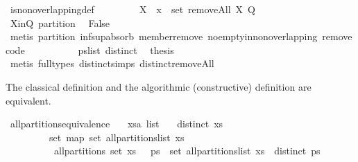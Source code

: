 \begin{isabellebody}
\ is{\isacharunderscore}non{\isacharunderscore}overlapping{\isacharunderscore}def\ \isacommand{{\isachardot}}\isamarkupfalse%
\isanewline
\ \ \ \ \ \ \isamarkupfalse%
\ {\isachardoublequoteopen}X\ {\isasymunion}\ {\isacharbraceleft}x{\isacharbraceright}\ {\isasymin}\ set\ {\isacharparenleft}removeAll\ X\ Q{\isacharparenright}{\isachardoublequoteclose}\isanewline
\ \ \ \ \ \ \isamarkupfalse%
\ X{\isacharunderscore}in{\isacharunderscore}Q\ partition\ \isamarkupfalse%
\ False\ \isamarkupfalse%
\ {\isacharparenleft}metis\ partition{\isacharprime}\ inf{\isacharunderscore}sup{\isacharunderscore}absorb\ member{\isacharunderscore}remove\ no{\isacharunderscore}empty{\isacharunderscore}in{\isacharunderscore}non{\isacharunderscore}overlapping\ remove{\isacharunderscore}code{\isacharparenleft}{}{\isacharparenright}{\isacharparenright}\isanewline
\ \ \ \ \isamarkupfalse%
\isanewline
\ \ \ \ \isamarkupfalse%
\ ps{\isacharunderscore}list\ distinct\ \isamarkupfalse%
\ {\isacharquery}thesis\ \isamarkupfalse%
\ {\isacharparenleft}metis\ {\isacharparenleft}full{\isacharunderscore}types{\isacharparenright}\ distinct{\isachardot}simps{\isacharparenleft}{}{\isacharparenright}\ distinct{\isacharunderscore}removeAll{\isacharparenright}\isanewline
\ \ \isamarkupfalse%
\isanewline
{}\isamarkupfalse%
%
\endisatagproof
{\isafoldproof}%
%
\isadelimproof
%
\endisadelimproof
%
\begin{isamarkuptext}%
The classical definition  and the algorithmic (constructive) definition  are equivalent.%
\end{isamarkuptext}%
\isamarkuptrue%
\isamarkupfalse%
\ all{\isacharunderscore}partitions{\isacharunderscore}equivalence{\isacharprime}{\isacharcolon}\isanewline
\ \ \ xs{\isacharcolon}{\isacharcolon}{\isachardoublequoteopen}{\isacharprime}a\ list{\isachardoublequoteclose}\isanewline
\ \ \ {\isachardoublequoteopen}distinct\ xs\ {\isasymLongrightarrow}\ \isanewline
\ \ \ \ \ \ \ \ \ {\isacharparenleft}{\isacharparenleft}set\ {\isacharparenleft}map\ set\ {\isacharparenleft}all{\isacharunderscore}partitions{\isacharunderscore}list\ xs{\isacharparenright}{\isacharparenright}\ {\isacharequal}\ \isanewline
\ \ \ \ \ \ \ \ \ \ all{\isacharunderscore}partitions\ {\isacharparenleft}set\ xs{\isacharparenright}{\isacharparenright}\ {\isasymand}\ {\isacharparenleft}{\isasymforall}\ ps\ {\isasymin}\ set\ {\isacharparenleft}all{\isacharunderscore}partitions{\isacharunderscore}list\ xs{\isacharparenright}\ {\isachardot}\ distinct\ ps{\isacharparenright}{\isacharparenright}{\isachardoublequoteclose}\isanewline

\end{isabellebody}
